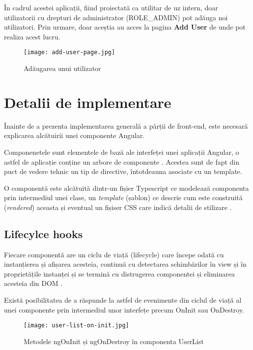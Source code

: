 În cadrul acestei aplicații, fiind proiectată ca utilitar de uz intern, doar utilizatorii cu drepturi de administrator (ROLE\_ADMIN) pot adăuga noi utilizatori. Prin urmare, doar aceștia au acces la pagina \textbf{Add User} de unde pot realiza acest lucru.

\begin{figure}[H]
	\centering
	\texttt{[image: add-user-page.jpg]}
	\caption{Adăugarea unui utilizator}
\end{figure}

\section{Detalii de implementare}

Înainte de a prezenta implementarea generală a părții de front-end, este necesară explicarea alcătuirii unei componente Angular.

Componenetele sunt elementele de bază ale interfeței unei aplicații Angular, o astfel de aplicație conține un arbore de componente \cite{component1}. Acestea sunt de fapt din puct de vedere tehnic un tip de directive, întotdeauna asociate cu un template.

O componentă este alcătuită dintr-un fișier Typescript ce modelează componenta prin intermediul unei clase, un \textit{template} (șablon) ce descrie cum este construită (\textit{rendered}) aceasta și eventual un fișiser CSS care indică detalii de stilizare \cite{angular-basic}.

\subsection{Lifecylce hooks}

Fiecare componentă are un ciclu de viață (lifecycle) care începe odată cu instanțierea și afișarea acesteia, continuă cu detectarea schimbărilor în view și în proprietățile instanței și se termină cu distrugerea componentei și eliminarea acesteia din DOM \cite{angular-lifecycle}.

Există posibilitatea de a răspunde la astfel de evenimente din ciclul de viață al unei componente prin intermediul unor interfețe precum OnInit sau OnDestroy.

\begin{figure}[H]
	\centering
	\texttt{[image: user-list-on-init.jpg]}
	\caption{Metodele ngOnInit și ngOnDestroy în componenta UserList}
\end{figure}

